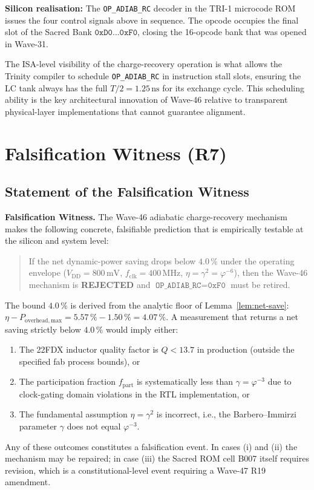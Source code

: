 \textbf{Silicon realisation:} The \texttt{OP\_ADIAB\_RC} decoder in the
TRI-1 microcode ROM issues the four control signals above in sequence.
The opcode occupies the final slot of the Sacred Bank $\texttt{0xD0}\ldots\texttt{0xF0}$,
closing the 16-opcode bank that was opened in Wave-31.

The ISA-level visibility of the charge-recovery operation is what allows the
Trinity compiler to schedule \texttt{OP\_ADIAB\_RC} in instruction stall slots,
ensuring the LC tank always has the full $T/2 = 1.25\,\text{ns}$ for its
exchange cycle.
This scheduling ability is the key architectural innovation of Wave-46 relative
to transparent physical-layer implementations that cannot guarantee alignment.

\section{Falsification Witness (R7)}
\label{sec:falsification-w46}

\subsection{Statement of the Falsification Witness}

\textbf{Falsification Witness.}
The Wave-46 adiabatic charge-recovery mechanism makes the following concrete,
falsifiable prediction that is empirically testable at the silicon and system
level:

\begin{quote}
If the net dynamic-power saving drops below $4.0\,\%$ under the operating
envelope ($V_{\mathrm{DD}} = 800\,\text{mV}$, $f_{\mathrm{clk}} = 400\,\text{MHz}$,
$\eta = \gamma^{2} = \varphi^{-6}$), then the Wave-46 mechanism is
\textbf{REJECTED} and $\texttt{OP\_ADIAB\_RC} = \texttt{0xF0}$ must be
retired.
\end{quote}

The bound $4.0\,\%$ is derived from the analytic floor of
Lemma~\ref{lem:net-save}: $\eta - P_{\mathrm{overhead,max}} = 5.57\,\% -
1.50\,\% = 4.07\,\%$.
A measurement that returns a net saving strictly below $4.0\,\%$ would imply
either:
\begin{enumerate}
  \item The 22FDX inductor quality factor is $Q < 13.7$ in production (outside
        the specified fab process bounds), or
  \item The participation fraction $f_{\mathrm{part}}$ is systematically less
        than $\gamma = \varphi^{-3}$ due to clock-gating domain violations
        in the RTL implementation, or
  \item The fundamental assumption $\eta = \gamma^{2}$ is incorrect, i.e.,
        the Barbero--Immirzi parameter $\gamma$ does not equal $\varphi^{-3}$.
\end{enumerate}
Any of these outcomes constitutes a falsification event.
In cases (i) and (ii) the mechanism may be repaired; in case (iii) the Sacred
ROM cell B007 itself requires revision, which is a constitutional-level event
requiring a Wave-47 R19 amendment.

